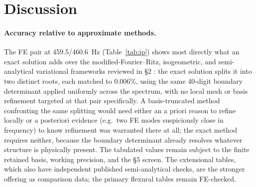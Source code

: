\documentclass[11pt]{article}
\begin{document}
\section{Discussion}

\paragraph{Accuracy relative to approximate methods.} The FE pair at
459.5/460.6~Hz (Table~\ref{tab:ip}) shows most directly what an exact
solution adds over the modified-Fourier--Ritz,
isogeometric, and semi-analytical variational frameworks reviewed in \S2
\cite{wangfgm2016,wang2016,li2017fgm,qin2018,shi2014,wangip2016,guan}: the
exact solution splits it into two distinct roots, each matched to 0.006\%,
using the same 40-digit boundary determinant applied uniformly across the
spectrum, with no local mesh or basis refinement targeted at that pair
specifically. A basis-truncated method confronting the same splitting
would need either an a priori reason to refine locally or a posteriori
evidence (e.g.\ two FE modes suspiciously close in frequency) to know
refinement was warranted there at all; the exact method requires neither,
because the boundary determinant already resolves whatever structure is
physically present. The tabulated values remain subject to the finite
retained basis, working precision, and the \S5 screen. The extensional
tables, which also have independent published semi-analytical checks, are
the stronger offering as comparison data; the primary flexural tables
remain FE-checked.
\end{document}
